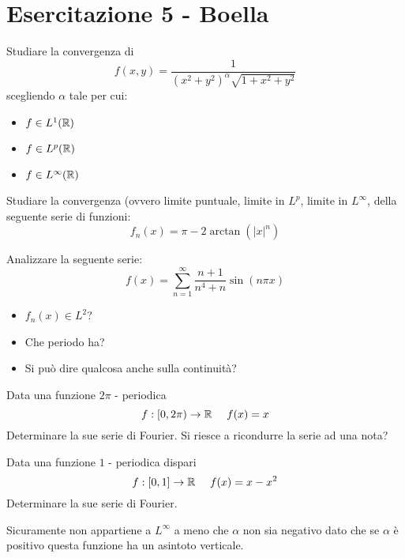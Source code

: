 \chapter{Esercitazione 5 - Boella}
\ParteEsercizi
\Esercizio{}

Studiare la convergenza di
\begin{equation*}
f(x, y) = \frac{1}{(x^{2} + y^{2})^{\alpha}\sqrt{1 + x^{2} + y^{2}}}
\end{equation*}
scegliendo $\alpha $ tale per cui:
\begin{itemize}
\item $f\in L^{1} (\mathbb{R})$
\item $f\in L^{p} (\mathbb{R})$
\item $f\in L^{\infty} (\mathbb{R})$
\end{itemize}
\Esercizio{}

Studiare la convergenza (ovvero limite puntuale, limite in $L^{p}$, limite in $L^{\infty}$, della seguente serie di funzioni:
\begin{equation*}
f_{n} (x) = \pi - 2\arctan (|x|^{n})
\end{equation*}
\Esercizio{}

Analizzare la seguente serie:
\begin{equation*}
f(x) = \sum^{\infty}_{n = 1}\frac{n + 1}{n^{4} + n}\sin (n\pi x)
\end{equation*}
\begin{itemize}
\item $f_{n} (x)\in L^{2}$?
\item Che periodo ha?
\item Si può dire qualcosa anche sulla continuità?
\end{itemize}
\Esercizio{}

Data una funzione $2\pi $ - periodica
\begin{equation*}
f:[ 0, 2\pi)\rightarrow \RR \ \ \ \ f(x) = x
\end{equation*}
Determinare la sue serie di Fourier. Si riesce a ricondurre la serie ad una nota?
\Esercizio{}

Data una funzione $1$ - periodica dispari
\begin{equation*}
f:[ 0, 1]\rightarrow \mathbb{R} \ \ \ \ f(x) = x - x^{2}
\end{equation*}
Determinare la sue serie di Fourier.
\ParteSoluzioni
\Soluzione

Sicuramente non appartiene a $L^{\infty}$ a meno che $\alpha $ non sia negativo dato che se $\alpha $ è positivo questa funzione ha un asintoto verticale.

